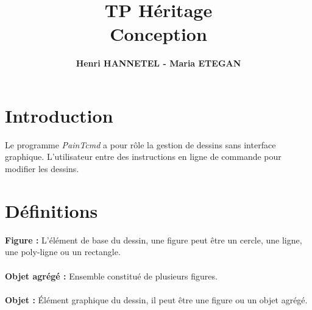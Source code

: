 \documentclass[legalpaper]{article}
\title{TP Héritage\\ Conception}
\author{\textbf{Henri HANNETEL - Maria ETEGAN}}
\date{}
\begin{document}
\maketitle

\section*{\large{Introduction}}
\hspace*{\parindent}Le programme \textit{PainTcmd} a pour rôle la gestion de dessins sans interface graphique. L'utilisateur entre des instructions en ligne de commande pour modifier les dessins.\\


\section{Définitions}
\hspace*{\parindent}\textbf{Figure :} L'élément de base du dessin, une figure peut être un cercle, une ligne, une poly-ligne ou un rectangle. \\
\\
\hspace*{\parindent}\textbf{Objet agrégé :} Ensemble constitué de plusieurs figures. \\
\\
\hspace*{\parindent}\textbf{Objet :} Élément graphique du dessin, il peut être une figure ou un objet agrégé. \\
\end{document}
